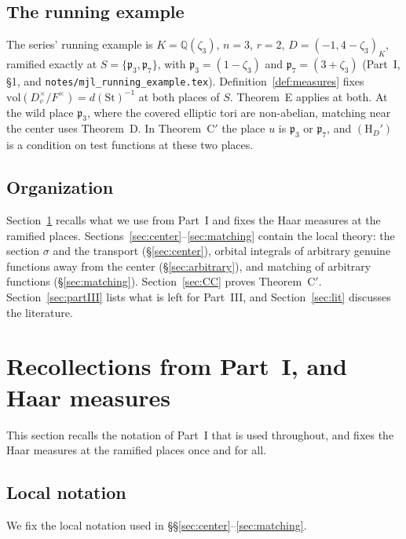 \documentclass[12pt]{article}
\newcommand{\St}{\mathrm{St}}
\newcommand{\sg}{\sigma}
\theoremstyle{plain}
\theoremstyle{definition}
\begin{document}
\subsection*{The running example}
The series' running example is $K=\mathbb{Q}(\zeta_3)$, $n=3$, $r=2$, $D=(-1,4-\zeta_3)_K$, ramified exactly at $S=\{\mathfrak p_3,\mathfrak p_7\}$, with $\mathfrak p_3=(1-\zeta_3)$ and $\mathfrak p_7=(3+\zeta_3)$ (Part~I, \S1, and \texttt{notes/mjl\_running\_example.tex}). Definition~\ref{def:measures} fixes $\mathrm{vol}(D_v^\times/F^\times)=d(\St)^{-1}$ at both places of $S$. Theorem~E applies at both. At the wild place $\mathfrak p_3$, where the covered elliptic tori are non-abelian, matching near the center uses Theorem~D. In Theorem~C$'$ the place $u$ is $\mathfrak p_3$ or $\mathfrak p_7$, and $(\mathrm H_D')$ is a condition on test functions at these two places.

\subsection{Organization}
Section~\ref{sec:recall} recalls what we use from Part~I and fixes the Haar measures at the ramified places. Sections~\ref{sec:center}--\ref{sec:matching} contain the local theory: the section $\sg$ and the transport (\S\ref{sec:center}), orbital integrals of arbitrary genuine functions away from the center (\S\ref{sec:arbitrary}), and matching of arbitrary functions (\S\ref{sec:matching}). Section~\ref{sec:CC} proves Theorem~C$'$. Section~\ref{sec:partIII} lists what is left for Part~III, and Section~\ref{sec:lit} discusses the literature.

\section{Recollections from Part~I, and Haar measures}\label{sec:recall}
This section recalls the notation of Part~I that is used throughout, and fixes the Haar measures at the ramified places once and for all.

\subsection{Local notation}\label{subsec:localnotation}
We fix the local notation used in \S\S\ref{sec:center}--\ref{sec:matching}.
\end{document}
